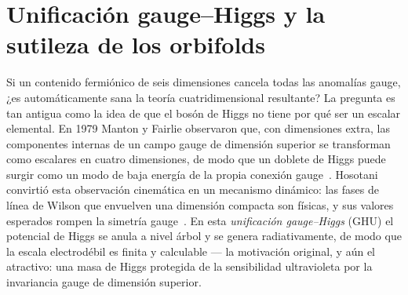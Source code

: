 \documentclass[11pt,a4paper]{article}
\begin{document}
\section{Unificaci\'on gauge--Higgs y la sutileza de los orbifolds}\label{sec:intro}
Si un contenido fermi\'onico de seis dimensiones cancela todas las anomal\'ias gauge,
¿es autom\'aticamente sana la teor\'ia cuatridimensional resultante? La pregunta es tan
antigua como la idea de que el bos\'on de Higgs no tiene por qu\'e ser un escalar
elemental. En 1979 Manton y Fairlie observaron que, con dimensiones extra, las
componentes internas de un campo gauge de dimensi\'on superior se transforman como
escalares en cuatro dimensiones, de modo que un doblete de Higgs puede surgir como un
modo de baja energ\'ia de la propia conexi\'on gauge~\cite{Manton,Fairlie}. Hosotani
convirti\'o esta observaci\'on cinem\'atica en un mecanismo din\'amico: las fases de
l\'inea de Wilson que envuelven una dimensi\'on compacta son f\'isicas, y sus valores
esperados rompen la simetr\'ia gauge~\cite{Hosotani}. En esta \emph{unificaci\'on
gauge--Higgs} (GHU) el potencial de Higgs se anula a nivel \'arbol y se genera
radiativamente, de modo que la escala electrod\'ebil es finita y calculable --- la
motivaci\'on original, y a\'un el atractivo: una masa de Higgs protegida de la
sensibilidad ultravioleta por la invariancia gauge de dimensi\'on superior.
\end{document}
